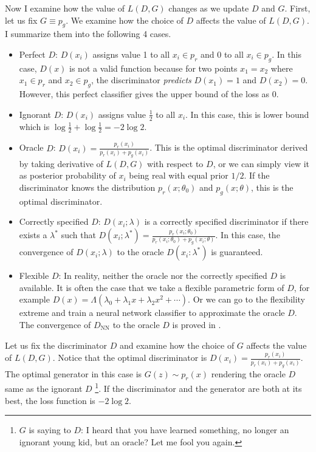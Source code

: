 \documentclass[12pt]{article}
\begin{document}
Now I examine how the value of $L(D, G)$ changes as we update $D$ and $G$.
First, let us fix $G \equiv p_g$. We examine how the choice of $D$ affects the
value of $L(D, G)$. I summarize them into the following 4 cases.
\begin{itemize}
    \item Perfect $D$: $D(x_i)$ assigns value 1 to all $x_i \in p_r$ and 0 to all $x_i
              \in p_g$. In this case, $D(x)$ is not a valid function because for two points
          $x_1=x_2$ where $x_1 \in p_r$ and $x_2 \in p_g$, the discriminator
          \textit{predicts} $D(x_1)=1$ and $D(x_2)=0$. However, this perfect classifier
          gives the upper bound of the loss as 0.
    \item Ignorant $D$: $D(x_i)$ assigns value $\frac{1}{2}$ to all $x_i$. In this case,
          this is lower bound which is $\log \frac{1}{2} + \log \frac{1}{2} = -2\log 2$.
    \item Oracle $D$: $D(x_i)=\frac{p_r(x_i)}{p_r(x_i)+p_g(x_i)}$. This is the optimal
          discriminator derived by taking derivative of $L(D, G)$ with respect to $D$, or
          we can simply view it as posterior probability of $x_i$ being real with equal
          prior $1/2$. If the discriminator knows the distribution $p_r(x;\theta_0)$ and
          $p_g(x;\theta)$, this is the optimal discriminator.
    \item Correctly specified $D$: $D(x_i;\lambda)$ is a correctly specified
          discriminator if there exists a $\lambda^*$ such that
          $D(x_i;\lambda^*)=\frac{p_r(x_i;\theta_0)}{p_r(x_i;\theta_0)+p_g(x_i;\theta)}$.
          In this case, the convergence of $D(x_i;\lambda)$ to the oracle
          $D(x_i:\lambda^*)$ is guaranteed.
    \item Flexible $D$: In reality, neither the oracle nor the correctly specified $D$ is
          available. It is often the case that we take a flexible parametric form of $D$,
          for example $D(x)=\Lambda(\lambda_0+\lambda_1 x+\lambda_2 x^2+\cdots)$. Or we
          can go to the flexibility extreme and train a neural network classifier to
          approximate the oracle $D$. The convergence of $D_\text{NN}$ to the oracle $D$
          is proved in \citet{}.
\end{itemize}

Let us fix the discriminator $D$ and examine how the choice of $G$ affects the
value of $L(D, G)$. Notice that the optimal discriminator is
$D(x_i)=\frac{p_r(x_i)}{p_r(x_i)+p_g(x_i)}$. The optimal generator in this case
is $G(z)\sim p_r(x)$ rendering the oracle $D$ same as the ignorant $D$
\footnote{$G$ is saying to $D$: I heard that you have learned something, no
    longer an ignorant young kid, but an oracle? Let me fool you again.}. If the
discriminator and the generator are both at its best, the loss function is
$-2\log 2$.
\end{document}
